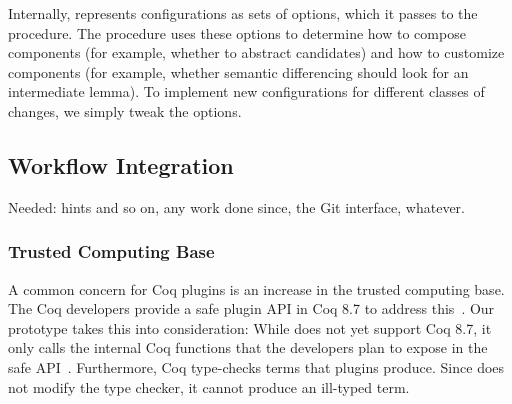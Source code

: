 Internally, \sysname represents configurations as sets of options,
which it passes to the procedure. The procedure uses these options to determine
how to compose components (for example, whether to abstract candidates) 
and how to customize components (for example, whether semantic differencing should look for an intermediate lemma).
To implement new configurations for different classes of changes, we simply tweak the options.

\subsection{Workflow Integration}

Needed: hints and so on, any work done since, the Git interface, whatever.

\subsubsection{Trusted Computing Base}
\label{sec:tcb}

A common concern for Coq plugins is an increase in the trusted computing base.
The Coq developers provide a safe plugin API in Coq 8.7 to address this~\cite{coq87news}.
Our prototype takes this into consideration:
While \sysname does not yet support Coq 8.7, it only calls the internal Coq functions that the 
developers plan to expose in the safe API~\cite{coqPR}.
Furthermore, Coq type-checks terms that plugins produce.
Since \sysname does not modify the type checker, it cannot produce an ill-typed term.
